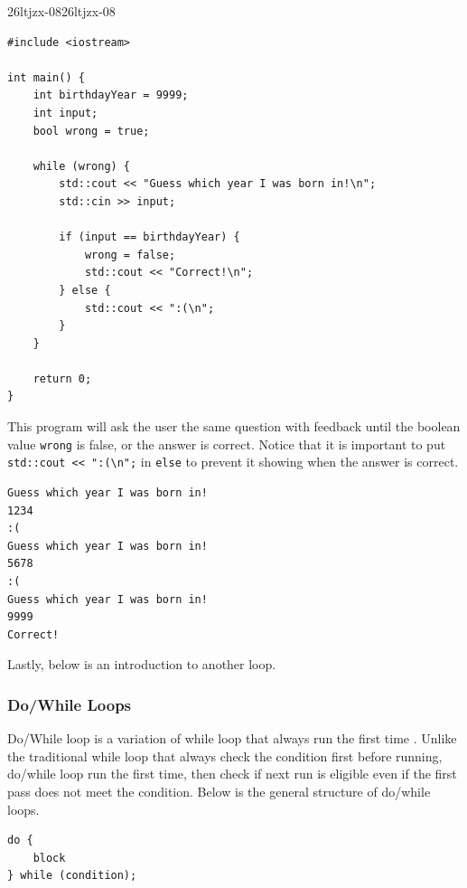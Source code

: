 \documentclass[../../../main.tex]{subfiles}
\begin{document}
\begin{cppbox}{26ltjzx-08}{26ltjzx-08}
\begin{lstlisting}[style=cppstyle]
#include <iostream>

int main() {
    int birthdayYear = 9999;
    int input;
    bool wrong = true;

    while (wrong) {
        std::cout << "Guess which year I was born in!\n";
        std::cin >> input;

        if (input == birthdayYear) {
            wrong = false;
            std::cout << "Correct!\n";
        } else {
            std::cout << ":(\n";
        }
    }

    return 0;
}
\end{lstlisting}
\end{cppbox}

This program will ask the user the same question with feedback
until the boolean value \verb|wrong| is false, or the answer is
correct. Notice that it is important to put
\verb|std::cout << ":(\n";| in \verb|else| to prevent it showing
when the answer is correct.

\begin{outputbox}
\begin{lstlisting}[style=basic]
Guess which year I was born in!
1234
:(
Guess which year I was born in!
5678
:(
Guess which year I was born in!
9999
Correct!
\end{lstlisting}
\end{outputbox}

Lastly, below is an introduction to another loop.

\subsubsection{Do/While Loops}

Do/While loop is a variation of while loop that always run the first
time \cite{CS02-4}. Unlike the traditional while loop that always
check the condition first before running, do/while loop run the first
time, then check if next run is eligible even if the first pass does
not meet the condition. Below is the general structure of do/while
loops.

\begin{basicbox}
\begin{lstlisting}[style=basic]
do {
    block
} while (condition);
\end{lstlisting}
\end{basicbox}
\end{document}
